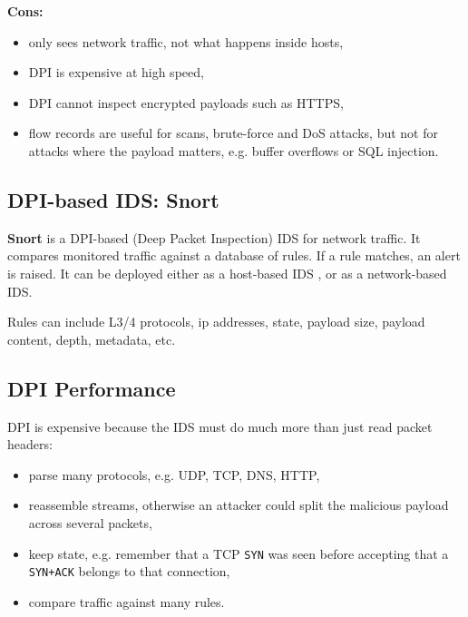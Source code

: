 \textbf{Cons:}
\begin{itemize}
    \item only sees network traffic, not what happens inside hosts,
    \item DPI is expensive at high speed,
    \item DPI cannot inspect encrypted payloads such as HTTPS,
    \item flow records are useful for scans, brute-force and DoS attacks, but not for attacks where the payload matters, e.g. buffer overflows or SQL injection.
\end{itemize}



\subsection{DPI-based IDS: Snort}

\textbf{Snort} is a DPI-based (Deep Packet Inspection) IDS for network traffic. It compares monitored traffic against a database of rules. If a rule matches, an alert is raised. It can be deployed either as a host-based IDS , or as a network-based IDS.




Rules can include L3/4 protocols, ip addresses, state, payload size, payload content, depth, metadata, etc.

\subsection{DPI Performance}

DPI is expensive because the IDS must do much more than just read packet headers:
\begin{itemize}
    \item parse many protocols, e.g. UDP, TCP, DNS, HTTP,
    \item reassemble streams, otherwise an attacker could split the malicious payload across several packets,
    \item keep state, e.g. remember that a TCP \texttt{SYN} was seen before accepting that a \texttt{SYN+ACK} belongs to that connection,
    \item compare traffic against many rules.
\end{itemize}

